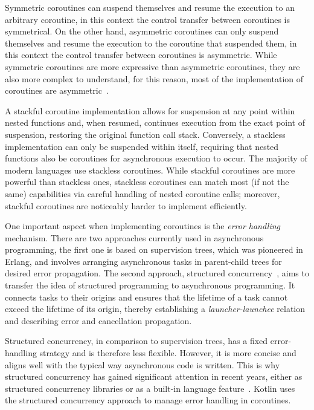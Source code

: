 Symmetric coroutines can suspend themselves and resume the execution to an arbitrary coroutine, in this context the control transfer between
coroutines is symmetrical. On the other hand, asymmetric coroutines can only suspend themselves and resume the execution to the coroutine that
suspended them, in this context the control transfer between coroutines is asymmetric. While symmetric coroutines are more expressive than asymmetric
coroutines, they are also more complex to understand, for this reason, most of the implementation of coroutines are
asymmetric~\cite{elizarov2021kotlin}.

A stackful coroutine implementation allows for suspension at any point within nested functions and, when resumed, continues execution from the exact
point of suspension, restoring the original function call stack. Conversely, a stackless implementation can only be suspended within itself,
requiring that nested functions also be coroutines for asynchronous execution to occur. The majority of modern languages use stackless coroutines.
While stackful coroutines are more powerful than stackless ones, stackless coroutines can match most (if not the same) capabilities
via careful handling of nested coroutine calls; moreover, stackful coroutines are noticeably harder to implement efficiently.

One important aspect when implementing coroutines is the \emph{error handling} mechanism.
There are two approaches currently used in asynchronous programming, the first one is based on supervision trees, which was pioneered in Erlang,
and involves arranging asynchronous tasks in parent-child trees for desired error propagation. The second approach, structured
concurrency~\cite{structured-concurrency}, aims to transfer the idea of structured programming to asynchronous programming. It connects tasks to
their origins and ensures that the lifetime of a task cannot exceed the lifetime of its origin, thereby establishing a \emph{launcher-launchee}
relation and describing error and cancellation propagation.

Structured concurrency, in comparison to supervision trees, has a fixed error-handling strategy and is therefore less flexible. However, it is more
concise and aligns well with the typical way asynchronous code is written. This is why structured concurrency has gained significant attention in
recent years, either as structured concurrency libraries or as a built-in language feature~\cite{alan-struct-concurr}. Kotlin uses the structured
concurrency approach to manage error handling in coroutines.

